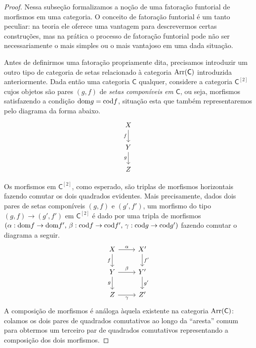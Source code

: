 \begin{proof}
  Nessa subseção formalizamos a noção de uma fatoração funtorial de morfismos em uma categoria.
  O conceito de fatoração funtorial é um tanto peculiar: na teoria ele oferece uma vantagem para descrevermos certas construções, mas na prática o processo de fatoração funtorial pode não ser necessariamente o mais simples ou o mais vantajoso em uma dada situação.
  
  Antes de definirmos uma fatoração propriamente dita, precisamos introduzir um outro tipo de categoria de setas relacionado à categoria $\mathrm{Arr}(\mathsf{C})$ introduzida anteriormente.
  Dada então uma categoria $\mathsf{C}$ qualquer, considere a categoria $\mathsf{C}^{[2]}$ cujos objetos são pares $(g,f)$ de \emph{setas componíveis em $\mathsf{C}$}, ou seja, morfismos satisfazendo a condição $\mathrm{dom} g = \mathrm{cod} f$, situação esta que também representaremos pelo diagrama da forma abaixo.
  \begin{displaymath}
    \begin{tikzcd}
      X
      \arrow[d, "f" swap]
      \\ Y
      \arrow[d, "g" swap]
      \\ Z
    \end{tikzcd}
  \end{displaymath}
  
  Os morfismos em $\mathsf{C}^{[2]}$, como esperado, são triplas de morfismos horizontais fazendo comutar os dois quadrados evidentes.
  Mais precisamente, dados dois pares de setas componíveis $(g,f)$ e $(g',f')$, um morfismo do tipo $(g,f) \to (g',f')$ em $\mathsf{C}^{[2]}$ é dado por uma tripla de morfismos $(\alpha: \mathrm{dom} f \to \mathrm{dom} f',\, \beta: \mathrm{cod} f \to \mathrm{cod} f',\, \gamma: \mathrm{cod} g \to \mathrm{cod} g')$ fazendo comutar o diagrama a seguir.
  \begin{displaymath}
    \begin{tikzcd}
      X
      \arrow[r, "\alpha"]
      \arrow[d, "f" swap]
      & X'
      \arrow[d, "f'"]
      \\ Y
      \arrow[r, "\beta"]
      \arrow[d, "g" swap]
      & Y'
      \arrow[d, "g'"]
      \\ Z
      \arrow[r, "\gamma" swap]
      & Z'
    \end{tikzcd}
  \end{displaymath}
  A composição de morfismos é análoga àquela existente na categoria $\mathrm{Arr}(\mathsf{C})$: colamos os dois pares de quadrados comutativos ao longo da ``aresta'' comum para obtermos um terceiro par de quadrados comutativos representando a composição dos dois morfismos.
  

\end{proof}
